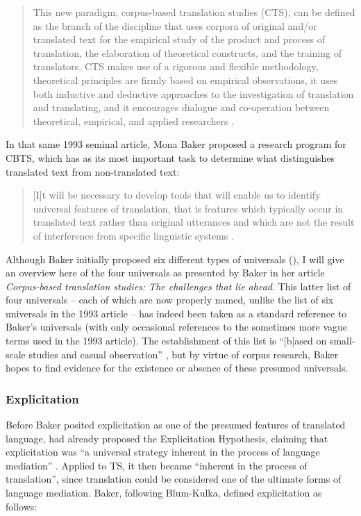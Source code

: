 \begin{quote}
This new paradigm, corpus-based translation studies (CTS), can be defined as the branch of the discipline that uses corpora of original and\slash or translated text for the empirical study of the product and process of translation, the elaboration of theoretical constructs, and the training of translators. CTS makes use of a rigorous and flexible methodology, theoretical principles are firmly based on empirical observations, it uses both inductive and deductive approaches to the investigation of translation and translating, and it encourages dialogue and co-operation between theoretical, empirical, and applied researchers \citep[45]{granger_corpora_2003}.
\end{quote}

In that same 1993 seminal article, Mona Baker proposed a research program for CBTS, which has as its most important task to determine what distinguishes translated text from non-translated text:

\begin{quote}
[I]t will be necessary to develop tools that will enable us to identify universal features of translation, that is features which typically occur in translated text rather than original utterances and which are not the result of interference from specific linguistic systems \citep[243]{baker_corpus_1993}.
\end{quote}

Although Baker initially proposed six different types of universals (\citeyear[243--245]{baker_corpus_1993}), I will give an overview here of the four universals as presented by Baker in her \citeyear{baker_corpus-based_1996} article \textit{Corpus-based translation studies: The challenges that lie ahead}. This latter list of four universals – each of which are now properly named, unlike the list of six universals in the 1993 article – has indeed been taken as a standard reference to Baker’s universals (with only occasional references to the sometimes more vague terms used in the 1993 article). The establishment of this list is “[b]ased on small-scale studies and casual observation” \citep[243]{baker_corpus_1993}, but by virtue of corpus research, Baker hopes to find evidence for the existence or absence of these presumed universals.

\subsubsection{Explicitation}
\label{sec:2.2.2.1}  
Before Baker posited explicitation as one of the presumed features of translated language, \citet{house_shifts_1986} had already proposed the Explicitation Hypothesis, claiming that explicitation was “a universal strategy inherent in the process of language mediation” \citep[21]{house_shifts_1986}. Applied to TS, it then became “inherent in the process of translation”, since translation could be considered one of the ultimate forms of language mediation. Baker, following Blum-Kulka, defined explicitation as follows:

